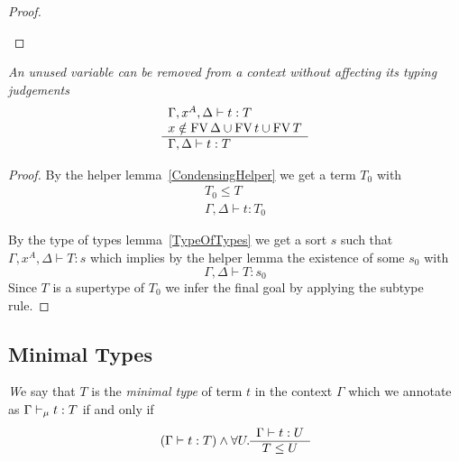 \begin{lemma}
\begin{proof}
{\begin{enumerate}
\begin{enumerate}
            \end{enumerate}
        \end{enumerate}
        }
    \end{proof}
\end{lemma}



\begin{lemma}
    \label{Condensing}
    \emph{An unused variable can be removed from a context without affecting its
    typing judgements}
    $$
    \begin{array}{l} 
        \Gamma,x^A,\Delta \vdash t: T
        \\
        x \notin \text{FV}\, \Delta \cup \text{FV}\, t \cup \text{FV}\, T
     \\ \hline 
        \Gamma, \Delta \vdash t : T
    \end{array}
    $$

    \begin{proof}
        By the helper lemma~\ref{CondensingHelper} we get a term $T_0$ with
        $$
        \begin{array}{l}
            T_0 \le T
            \\
            \Gamma,\Delta \vdash t : T_0
        \end{array}
        $$

        By the type of types lemma~\ref{TypeOfTypes} we get a sort $s$ such that
        $\Gamma,x^A,\Delta \vdash T : s$ which implies by the helper lemma the
        existence of some $s_0$ with
        $$
        \Gamma,\Delta \vdash T : s_0
        $$
        Since $T$ is a supertype of $T_0$ we infer the final goal by applying
        the subtype rule.
    \end{proof}
\end{lemma}






\subsection{Minimal Types}

\begin{definition}
    \emph We say that $T$ is the \emph{minimal type} of term $t$ in the
    context $\Gamma$ which we annotate as $\Gamma \vdash_\mu t: T$ if and only
    if
    $$
    (\Gamma \vdash t: T)
    \land
    \forall U. \begin{array}{c} \Gamma \vdash t: U \\ \hline T \le U\end{array}
    $$
\end{definition}


